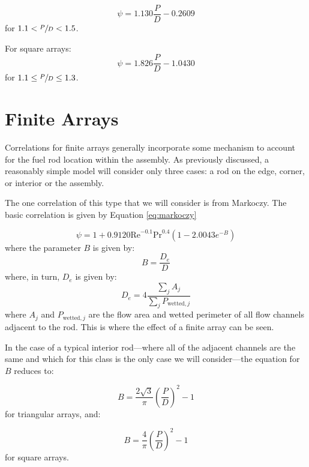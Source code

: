 \begin{equation}
\psi = 1.130 \frac{P}{D} - 0.2609
\end{equation}
for $1.1 < \sfrac{P}{D} < 1.5$.

For square arrays:
\begin{equation}
\psi = 1.826 \frac{P}{D} - 1.0430
\end{equation}
for $1.1 \le \sfrac{P}{D} \le 1.3$.

\section{Finite Arrays}
Correlations for finite arrays generally incorporate some mechanism to account for the fuel rod location within the assembly.  As previously discussed, a reasonably simple model will consider only three cases: a rod on the edge, corner, or interior or the assembly.  

The one correlation of this type that we will consider is from Markoczy.\cite{markoczy1972convective}  The basic correlation is given by Equation \ref{eq:markoczy}

\begin{equation}
\psi = 1 + 0.9120 \text{Re}^{-0.1} \text{Pr}^{0.4} \left(1 - 2.0043 e^{-B} \right)
\label{eq:markoczy}
\end{equation}
where the parameter $B$ is given by:
\begin{equation}
B = \frac{D_e}{D}
\end{equation}
where, in turn, $D_e$ is given by:
\begin{equation}
D_e = 4 \frac{\sum_j A_j}{\sum_j P_{\text{wetted},j}}
\end{equation}
where $A_j$ and $P_{\text{wetted},j}$ are the flow area and wetted perimeter of all flow channels adjacent to the rod.  This is where the effect of a finite array can be seen.

In the case of a typical interior rod---where all of the adjacent channels are the same and which for this class is the only case we will consider---the equation for $B$ reduces to:

\begin{equation}
B = \frac{2 \sqrt{3}}{\pi}\left(\frac{P}{D} \right)^2 - 1
\end{equation}
for triangular arrays, and:

\begin{equation}
B = \frac{4}{\pi}\left(\frac{P}{D} \right)^2 - 1
\end{equation}
for square arrays.

